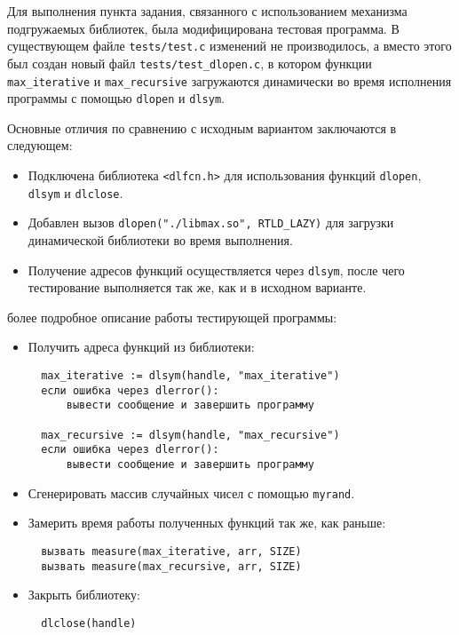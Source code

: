 Для выполнения пункта задания, связанного с использованием механизма подгружаемых библиотек, была модифицирована тестовая программа.
В существующем файле \texttt{tests/test.c} изменений не производилось, а вместо этого был создан новый файл \texttt{tests/test\_dlopen.c}, в котором функции \texttt{max\_iterative} и \texttt{max\_recursive} загружаются динамически во время исполнения программы с помощью \texttt{dlopen} и \texttt{dlsym}.

Основные отличия по сравнению с исходным вариантом заключаются в следующем:
\begin{itemize}
\item Подключена библиотека \texttt{<dlfcn.h>} для использования функций \texttt{dlopen}, \texttt{dlsym} и \texttt{dlclose}.
\item Добавлен вызов \texttt{dlopen("./libmax.so", RTLD\_LAZY)} для загрузки динамической библиотеки во время выполнения.
\item Получение адресов функций осуществляется через \texttt{dlsym}, после чего тестирование выполняется так же, как и в исходном варианте.
\end{itemize}

\vspace{.3cm}
 более подробное описание работы тестирующей программы:

\begin{itemize}
  \item Получить адреса функций из библиотеки:
  \begin{lstlisting}
  max_iterative := dlsym(handle, "max_iterative")
  если ошибка через dlerror():
      вывести сообщение и завершить программу
  
  max_recursive := dlsym(handle, "max_recursive")
  если ошибка через dlerror():
      вывести сообщение и завершить программу
  \end{lstlisting}
  
  \item Сгенерировать массив случайных чисел с помощью \texttt{myrand}.
  
  \item Замерить время работы полученных функций так же, как раньше:
  \begin{lstlisting}
  вызвать measure(max_iterative, arr, SIZE)
  вызвать measure(max_recursive, arr, SIZE)
  \end{lstlisting}
  
  \item Закрыть библиотеку:
  \begin{lstlisting}
  dlclose(handle)
  \end{lstlisting}
\end{itemize}

